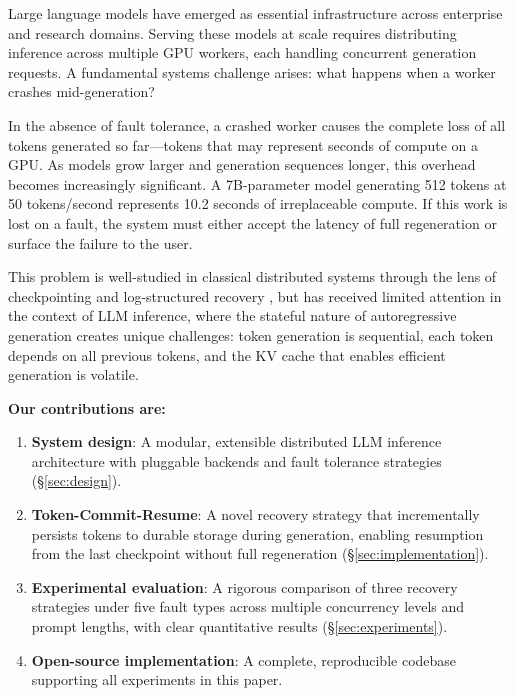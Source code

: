\documentclass[10pt,twocolumn]{article}
\begin{document}
Large language models have emerged as essential infrastructure across
enterprise and research domains. Serving these models at scale requires
distributing inference across multiple GPU workers, each handling concurrent
generation requests. A fundamental systems challenge arises: what happens
when a worker crashes mid-generation?

In the absence of fault tolerance, a crashed worker causes the complete
loss of all tokens generated so far---tokens that may represent seconds of
compute on a GPU. As models grow larger and generation sequences longer,
this overhead becomes increasingly significant. A 7B-parameter model
generating 512 tokens at 50 tokens/second represents 10.2 seconds of
irreplaceable compute. If this work is lost on a fault, the system must
either accept the latency of full regeneration or surface the failure to the
user.

This problem is well-studied in classical distributed systems through the
lens of checkpointing \cite{elnozahy2002survey} and log-structured recovery
\cite{gray1992transaction}, but has received limited attention in the context
of LLM inference, where the stateful nature of autoregressive generation
creates unique challenges: token generation is sequential, each token depends
on all previous tokens, and the KV cache that enables efficient generation
is volatile.

\textbf{Our contributions are:}
\begin{enumerate}[leftmargin=*,itemsep=0pt]
  \item \textbf{System design}: A modular, extensible distributed LLM
    inference architecture with pluggable backends and fault tolerance
    strategies (\S\ref{sec:design}).
  \item \textbf{Token-Commit-Resume}: A novel recovery strategy that
    incrementally persists tokens to durable storage during generation,
    enabling resumption from the last checkpoint without full regeneration
    (\S\ref{sec:implementation}).
  \item \textbf{Experimental evaluation}: A rigorous comparison of three
    recovery strategies under five fault types across multiple concurrency
    levels and prompt lengths, with clear quantitative results (\S\ref{sec:experiments}).
  \item \textbf{Open-source implementation}: A complete, reproducible codebase
    supporting all experiments in this paper.
\end{enumerate}

\end{document}
